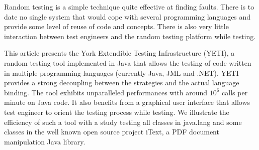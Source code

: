 Random testing is a simple technique quite effective at finding faults.
There is to date no single system that would cope with several programming languages and provide some level of reuse of code and concepts. There is also very little interaction between test engineers and the random testing platform while testing.

This article presents the York Extendible Testing Infrastructure (YETI), a random testing tool implemented in Java that allows the testing of code written in multiple programming languages (currently Java, JML and .NET). YETI provides a strong decoupling between the strategies and the actual language binding. The tool exhibits unparalleled performances with around $10^6$ calls per minute on Java code. It also benefits from a graphical user interface that allows test engineer to orient the testing process while testing. We illustrate the efficiency of such a tool  with a study testing all classes in java.lang and some classes in the well known open source project iText, a PDF document manipulation Java library.
